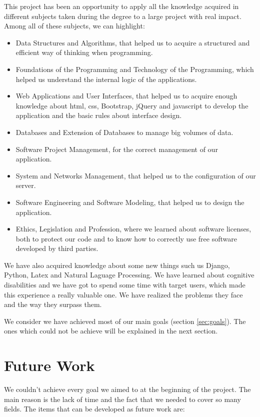 This project has been an opportunity to apply all the knowledge acquired
in different subjects taken during the degree to a large project with real impact. Among all of these subjects, we can highlight:

\begin{itemize}
	\item Data Structures and Algorithms, that helped us to acquire a structured and efficient way of thinking when programming.
	\item Foundations of the Programming and Technology of the Programming, which helped us understand the internal logic of the applications.
	\item Web Applications and User Interfaces, that helped us to acquire enough knowledge about html, css, Bootstrap, jQuery and javascript to develop the application and the basic rules about interface design.
	\item Databases and Extension of Databases to manage big volumes of data.
	\item Software Project Management, for the correct management of our application.
	\item System and Networks Management, that helped us to the configuration of our server.
	\item Software Engineering and Software Modeling, that helped us to design the application.
	\item Ethics, Legislation and Profession, where we learned about software licenses, both to protect our code and to know how to correctly use free software developed by third parties.
\end{itemize}

We have also acquired knowledge about some new things such us Django, Python, Latex and Natural Laguage Processing. We have learned about cognitive disabilities and we have got to spend some time with target users, which made this experience a really valuable one. We have realized the problems they face and the way they surpass them.

We consider we have achieved most of our main goals (section \ref{sec:goals}). The ones which could not be achieve will be explained in the next section.


\section{Future Work}
\label{sec:future_work}

We couldn't achieve every goal we aimed to at the beginning of the project. The main reason is the lack of time and the fact that we needed to cover so many fields. The items that can be developed as future work are:

